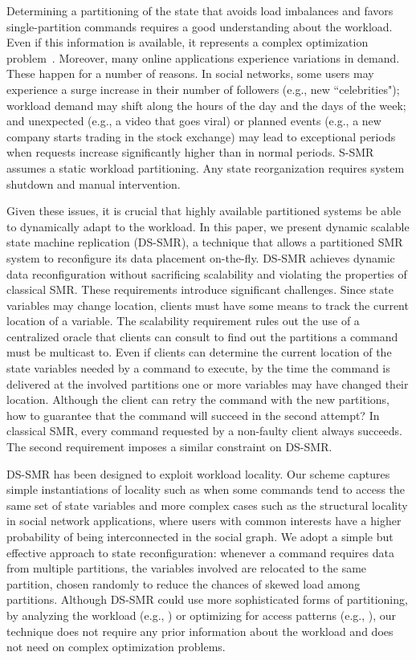 Determining a partitioning of the state that avoids load imbalances and favors single-partition commands requires a good understanding about the workload. 
Even if this information is available, it represents a complex optimization problem~\cite{curino2010sch,taft2014est}.
Moreover, many online applications experience variations in demand. 
These happen for a number of reasons. 
In social networks, some users may experience a surge increase in their number of followers (e.g., new ``celebrities");
workload demand may shift along the hours of the day and the days of the week; and unexpected (e.g., a video that goes viral) or planned events (e.g., a new company starts trading in the stock exchange) may lead to exceptional periods when requests increase significantly higher than in normal periods.
S-SMR assumes a static workload partitioning.
Any state reorganization requires system shutdown and manual intervention.

Given these issues, it is crucial that highly available partitioned systems be able to dynamically adapt to the workload.
In this paper, we present dynamic scalable state machine replication (DS-SMR), a technique that allows a partitioned SMR system to reconfigure its data placement on-the-fly.
DS-SMR achieves dynamic data reconfiguration without sacrificing scalability and violating the properties of classical SMR.
These requirements introduce significant challenges.
Since state variables may change location, clients must have some means to track the current location of a variable.
The scalability requirement rules out the use of a centralized oracle that clients can consult to find out the partitions a command must be multicast to.
Even if clients can determine the current location of the state variables needed by a command to execute, by the time the command is delivered at the involved partitions one or more variables may have changed their location.
Although the client can retry the command with the new partitions, how to guarantee that the command will succeed in the second attempt?
In classical SMR, every command requested by a non-faulty client always succeeds.
The second requirement imposes a similar constraint on DS-SMR.

DS-SMR has been designed to exploit workload locality.
Our scheme captures simple instantiations of locality such as when some commands tend to access the same set of state variables and more complex cases such as the structural locality in social network applications, where users with common interests have a higher probability of being interconnected in the social graph.
We adopt a simple but effective approach to state reconfiguration: whenever a command requires data from multiple partitions, the variables involved are relocated to the same partition, chosen randomly to reduce the chances of skewed load among partitions.
Although DS-SMR could use more sophisticated forms of partitioning, by analyzing the workload (e.g., \cite{curino2010sch}) or optimizing for access patterns (e.g., \cite{taft2014est}), our technique does not require any prior information about the workload and does not need on complex optimization problems.



